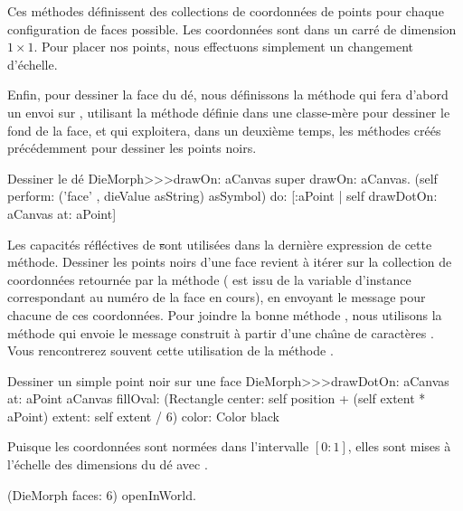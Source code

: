 \documentclass[a4paper,10pt,twoside]{book}
\begin{document}
Ces m\'ethodes d\'efinissent des collections de coordonn\'ees de
points pour chaque configuration de faces possible. Les coordonn\'ees
sont dans un carr\'e de dimension $1\times1$. Pour placer nos points,
nous effectuons simplement un changement d'\'echelle.

Enfin, pour dessiner la face du d\'e, nous d\'efinissons la m\'ethode
 qui fera d'abord un envoi sur , utilisant la m\'ethode
d\'efinie dans une classe-m\`ere pour dessiner le fond de la face, et
qui exploitera, dans un deuxi\`eme temps, les m\'ethodes cr\'e\'es
pr\'ec\'edemment pour dessiner les points noirs.

\begin{method}{Dessiner le d\'e}
DieMorph>>>drawOn: aCanvas
	super drawOn: aCanvas.
	(self perform: ('face' , dieValue asString) asSymbol)
		do: [:aPoint | self drawDotOn: aCanvas at: aPoint]
\end{method}

Les capacit\'es r\'efl\'ectives de \st sont utilis\'ees dans la
derni\`ere expression de cette m\'ethode. Dessiner les points noirs
d'une face revient \`a it\'erer sur la collection 
de coordonn\'ees
retourn\'ee par la m\'ethode  
( est issu de la variable d'instance 
correspondant au num\'ero de la face en cours),
en envoyant le message  pour chacune de ces
coordonn\'ees. Pour joindre la bonne m\'ethode %
, nous utilisons la m\'ethode  qui
envoie le message construit \`a partir d'une cha\^{\i}ne de
caract\`eres .
Vous rencontrerez souvent cette utilisation de la m\'ethode .

\begin{method}{Dessiner un simple point noir sur une face}
DieMorph>>>drawDotOn: aCanvas at: aPoint
	aCanvas
		fillOval: (Rectangle
			center: self position + (self extent * aPoint)
			extent: self extent / 6)
		color: Color black
\end{method}

Puisque les coordonn\'ees sont norm\'ees dans l'intervalle $[0{:}1]$,
elles sont mises \`a l'\'echelle des dimensions du d\'e avec 
.

\begin{code}{}
(DieMorph faces: 6) openInWorld.
\end{code}
\end{document}
